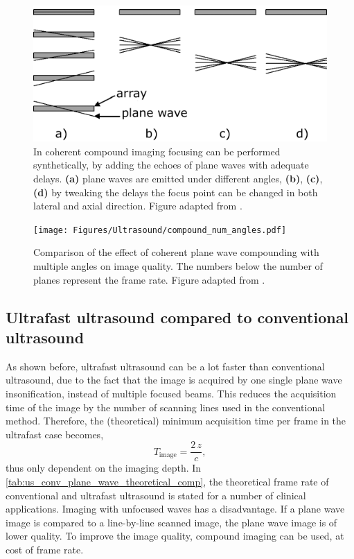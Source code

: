 \begin{figure}
	\centering
	\includegraphics[width=.6\linewidth]{Figures/Ultrasound/coherent_compounding.pdf}
	\caption{In coherent compound imaging focusing can be performed synthetically, by adding the echoes of plane waves with adequate delays. \textbf{(a)} plane waves are emitted under different angles, \textbf{(b)}, \textbf{(c)}, \textbf{(d)} by tweaking the delays the focus point can be changed in both lateral and axial direction. Figure adapted from \citet{montaldo_coherent_2009}.}
	\label{fig:us_coherent_compounding}
\end{figure}


\begin{figure}
    \centering
    \texttt{[image: Figures/Ultrasound/compound\_num\_angles.pdf]}
    \caption{Comparison of the effect of coherent plane wave compounding with multiple angles on image quality. The numbers below the number of planes represent the frame rate. Figure adapted from \citet{montaldo_coherent_2009}.}
    \label{fig:us_compound_num_angles}
\end{figure}





\subsection{Ultrafast ultrasound compared to conventional ultrasound}
As shown before, ultrafast ultrasound can be a lot faster than conventional ultrasound, due to the fact that the image is acquired by one single plane wave insonification, instead of multiple focused beams. This reduces the acquisition time of the image by the number of scanning lines used in the conventional method. Therefore, the (theoretical) minimum acquisition time per frame in the ultrafast case becomes, 
\begin{equation}
	T_\text{image} = \frac{2 \, z}{c},
\end{equation}
thus only dependent on the imaging depth. In \autoref{tab:us_conv_plane_wave_theoretical_comp}, the theoretical frame rate of conventional and ultrafast ultrasound is stated for a number of clinical applications. Imaging with unfocused waves has a disadvantage. If a plane wave image is compared to a line-by-line scanned image, the plane wave image is of lower quality. To improve the image quality, compound imaging can be used, at cost of frame rate. 


